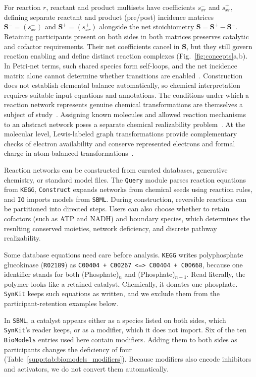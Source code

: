 \documentclass[10pt,a4paper,fleqn]{article}
\newcommand{\synkit}{\texttt{SynKit}\xspace}
\begin{document}
For reaction $r$, reactant and product multisets have coefficients $s^-_{xr}$ and $s^+_{xr}$, defining separate reactant and product (pre/post) incidence matrices $\mathbf S^-=(s^-_{xr})$ and $\mathbf S^+=(s^+_{xr})$ alongside the net stoichiometry $\mathbf S=\mathbf S^+-\mathbf S^-$. Retaining participants present on both sides in both matrices preserves catalytic and cofactor requirements. Their net coefficients cancel in $\mathbf S$, but they still govern reaction enabling and define distinct reaction complexes (Fig.~\ref{fig:concepts}a,b). In Petri-net terms, such shared species form self-loops, and the net incidence matrix alone cannot determine whether transitions are enabled~\cite{murata1989petri}. Construction does not establish elemental balance automatically, so chemical interpretation requires suitable input equations and annotations. The conditions under which a reaction network represents genuine chemical transformations are themselves a subject of study~\cite{muller2022chemical}. Assigning known molecules and allowed reaction mechanisms to an abstract network poses a separate chemical realizability problem~\cite{phan2026realizability}. At the molecular level, Lewis-labeled graph transformations provide complementary checks of electron availability and conserve represented electrons and formal charge in atom-balanced transformations~\cite{phan2026lewis}.

Reaction networks can be constructed from curated databases, generative chemistry, or standard model files. The \texttt{Query} module parses reaction equations from \texttt{KEGG}, \texttt{Construct} expands networks from chemical seeds using reaction rules, and \texttt{IO} imports models from \texttt{SBML}. During construction, reversible reactions can be partitioned into directed steps. Users can also choose whether to retain cofactors (such as ATP and NADH) and boundary species, which determines the resulting conserved moieties, network deficiency, and discrete pathway realizability.

Some database equations need care before analysis. \texttt{KEGG} writes polyphosphate glucokinase (\texttt{R02189}) as \texttt{C00404 + C00267 <=> C00404 + C00668}, because one identifier stands for both (Phosphate)$_n$ and (Phosphate)$_{n-1}$. Read literally, the polymer looks like a retained catalyst. Chemically, it donates one phosphate. \synkit keeps such equations as written, and we exclude them from the participant-retention examples below.

In \texttt{SBML}, a catalyst appears either as a species listed on both sides, which \synkit's reader keeps, or as a modifier, which it does not import. Six of the ten \texttt{BioModels} entries used here contain modifiers. Adding them to both sides as participants changes the deficiency of four (Table~\ref{supp:tab:biomodels_modifiers}). Because modifiers also encode inhibitors and activators, we do not convert them automatically.
\end{document}
